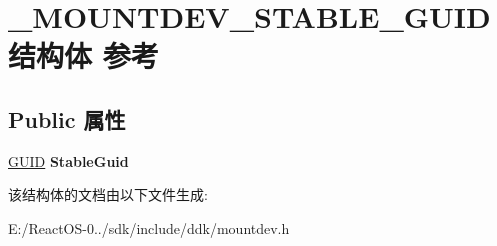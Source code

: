 \hypertarget{struct___m_o_u_n_t_d_e_v___s_t_a_b_l_e___g_u_i_d}{}\section{\+\_\+\+M\+O\+U\+N\+T\+D\+E\+V\+\_\+\+S\+T\+A\+B\+L\+E\+\_\+\+G\+U\+I\+D结构体 参考}
\label{struct___m_o_u_n_t_d_e_v___s_t_a_b_l_e___g_u_i_d}
\subsection*{Public 属性}
\begin{DoxyCompactItemize}
\item 
\mbox{\label{struct___m_o_u_n_t_d_e_v___s_t_a_b_l_e___g_u_i_d_a37dfabea9304a3377c42b8545f9ac9bb}} 
\hyperlink{interface_g_u_i_d}{G\+U\+ID} {\bfseries Stable\+Guid}
\end{DoxyCompactItemize}


该结构体的文档由以下文件生成\+:\begin{DoxyCompactItemize}
\item 
E\+:/\+React\+O\+S-\/0../sdk/include/ddk/mountdev.\+h\end{DoxyCompactItemize}
